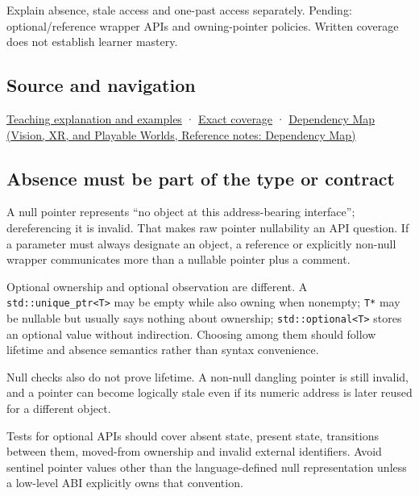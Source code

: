 Explain absence, stale access and one-past access separately. Pending: optional/reference wrapper APIs and owning-pointer policies. Written coverage does not establish learner mastery.

\subsection{Source and navigation}\label{appendix-afae48c31800-source-and-navigation}

\hyperref[01-foundations-i-ch003-a-pointer-carries-an-access-contract]{Teaching explanation and examples} · \hyperref[appendix-fd090d982a15-m008---parts-113-126]{Exact coverage} · \href{../07-Vision-XR-and-Playable-Worlds/main.pdf\#nameddest=appendix-4ad47bdd269a}{Dependency Map (Vision, XR, and Playable Worlds, Reference notes: Dependency Map)}

\subsection{Absence must be part of the type or contract}\label{appendix-afae48c31800-absence-must-be-part-of-the-type-or-contract}

A null pointer represents ``no object at this address-bearing interface''; dereferencing it is invalid. That makes raw pointer nullability an API question. If a parameter must always designate an object, a reference or explicitly non-null wrapper communicates more than a nullable pointer plus a comment.

Optional ownership and optional observation are different. A \texttt{std::unique\_ptr\textless{}T\textgreater{}} may be empty while also owning when nonempty; \texttt{T*} may be nullable but usually says nothing about ownership; \texttt{std::optional\textless{}T\textgreater{}} stores an optional value without indirection. Choosing among them should follow lifetime and absence semantics rather than syntax convenience.

Null checks also do not prove lifetime. A non-null dangling pointer is still invalid, and a pointer can become logically stale even if its numeric address is later reused for a different object.

Tests for optional APIs should cover absent state, present state, transitions between them, moved-from ownership and invalid external identifiers. Avoid sentinel pointer values other than the language-defined null representation unless a low-level ABI explicitly owns that convention.
